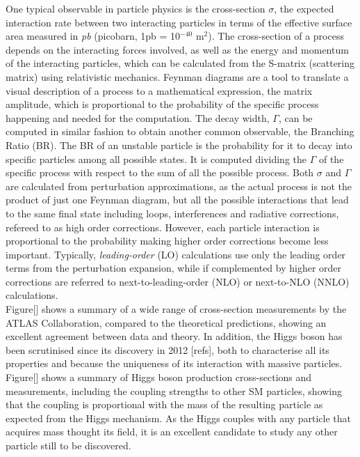 One typical observable in particle physics is the cross-section $\sigma$, the expected interaction rate between two interacting particles in terms of the effective surface area measured in \textit{pb} (picobarn, 1pb = 10$^{-40}$ m$^2$). The cross-section of a process depends on the interacting forces involved, as well as the energy and momentum of the interacting particles, which can be calculated from the S-matrix (scattering matrix) using relativistic mechanics. Feynman diagrams are a tool to translate a visual description of a process to a mathematical expression, the matrix amplitude, which is proportional to the probability of the specific process happening and needed for the computation. The decay width, $\Gamma$, can be computed in similar fashion to obtain another common observable, the Branching Ratio (BR). The BR of an unstable particle is the probability for it to decay into specific particles among all possible states. It is computed dividing the $\Gamma$ of the specific process with respect to the sum of all the possible process. Both $\sigma$ and $\Gamma$ are calculated from perturbation approximations, as the actual process is not the product of just one Feynman diagram, but all the possible interactions that lead to the same final state including loops, interferences and radiative corrections, refereed to as high order corrections. However, each particle interaction is proportional to the probability making higher order corrections become less important. Typically, \textit{leading-order} (LO) calculations use only the leading order terms from the perturbation expansion, while if complemented by higher order corrections are referred to next-to-leading-order (NLO) or next-to-NLO (NNLO) calculations.\\

Figure[] shows a summary of a wide range of cross-section measurements by the ATLAS Collaboration, compared to the theoretical predictions, showing an excellent agreement between data and theory. In addition, the Higgs boson has been scrutinised since its discovery in 2012 [refs], both to characterise all its properties and because the uniqueness of its interaction with massive particles. Figure[] shows a summary of Higgs boson production cross-sections and measurements, including the coupling strengths to other SM particles, showing that the coupling is proportional with the mass of the resulting particle as expected from the Higgs mechanism. As the Higgs couples with any particle that acquires mass thought its field, it is an excellent candidate to study any other particle still to be discovered.\\

